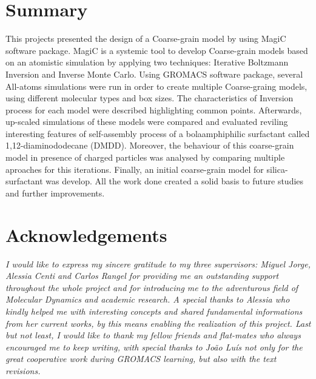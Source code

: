 \documentclass[10pt,a4paper,twoside]{article}
\begin{document}
\section{Summary}
\setcounter{page}{1}
This projects presented the design of a Coarse-grain model by using MagiC software package. MagiC is a  systemic tool to develop Coarse-grain models based on an atomistic simulation by applying two techniques: Iterative Boltzmann Inversion and Inverse Monte Carlo. Using GROMACS software package, several All-atoms simulations were run in order to create multiple Coarse-graing models, using different molecular types and box sizes. The characteristics of Inversion process for each model were described highlighting common points.  Afterwards, up-scaled simulations of these models were compared and evaluated reviling interesting features of self-assembly process of a bolaamphiphilic surfactant called 1,12-diaminododecane (DMDD). Moreover, the behaviour of this coarse-grain model in presence of charged particles was analysed  by comparing multiple aproaches for this iterations. Finally, an initial coarse-grain model for silica-surfactant was develop.  All the work done created a solid basis to future studies and further improvements.
\vfill
\newpage

\setcounter{tocdepth}{3}
\tableofcontents



\vfill
\newpage

\section{Acknowledgements}

\textit{I would like to express my sincere gratitude to my three supervisors: Miguel Jorge, Alessia Centi and Carlos Rangel for providing me an outstanding support throughout the whole project and for introducing me to the adventurous field of Molecular Dynamics and academic research. A special thanks to Alessia who kindly helped me with interesting concepts and shared fundamental informations from her current works, by this means enabling the realization of this project.
Last but not least, I would like to thank my fellow friends and flat-mates who always encouraged me to keep writing, with special thanks to João Luís not only for the great cooperative work during GROMACS learning, but also with the text revisions.}

\vfill
\newpage

\end{document}
